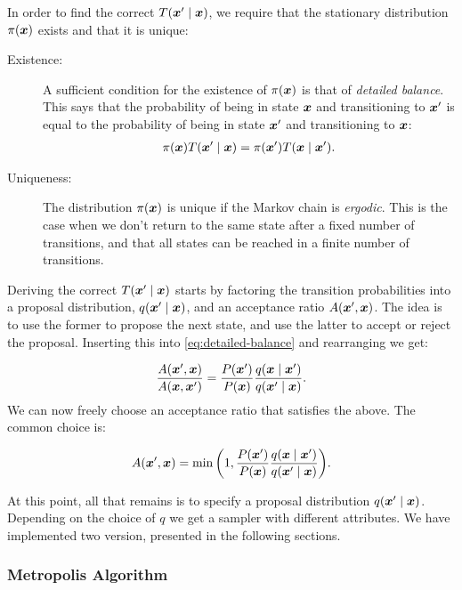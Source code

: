 \documentclass[Thesis.tex]{subfiles}
\begin{document}
In order to find the correct $T\qty(\bm{x}'\;\middle|\;\bm{x})$, we require that the stationary
distribution $\pi(\bm{x})$ exists and that it is unique:

\begin{description}
\item[Existence:] A sufficient condition for the existence of $\pi(\bm{x})$ is that
  of \emph{detailed balance}. This says that the probability of being in state
  $\bm{x}$ and transitioning to $\bm{x}'$ is equal to the probability of being in state
  $\bm{x}'$ and transitioning to $\bm{x}$:
  \begin{align}
    \label{eq:detailed-balance}
    \pi\qty(\bm{x})T\qty(\bm{x}'\;\middle|\;\bm{x}) = \pi\qty(\bm{x}')T\qty(\bm{x}\;\middle|\;\bm{x}').
  \end{align}
\item[Uniqueness:] The distribution $\pi(\bm{x})$ is unique if the Markov chain is
  \emph{ergodic}. This is the case when we don't return to the same state after
  a fixed number of transitions, and that all states can be reached in a finite
  number of transitions.
\end{description}
Deriving the correct $T\qty(\bm{x}'\;\middle|\;\bm{x})$ starts by factoring the transition
probabilities into a proposal distribution, $q\qty(\bm{x}'\;\middle|\;\bm{x})$, and an
acceptance ratio $A\qty(\bm{x}',\bm{x})$. The idea is to use the former to propose the
next state, and use the latter to accept or reject the proposal. Inserting this
into \cref{eq:detailed-balance} and rearranging we get:

\begin{align}
  \frac{A\qty(\bm{x}',\bm{x})}{A\qty(\bm{x},\bm{x}')} = \frac{P\qty(\bm{x}')}{P\qty(\bm{x})}\frac{q\qty(\bm{x}\;\middle|\;\bm{x}')}{q\qty(\bm{x}'\;\middle|\;\bm{x})}.
\end{align}
We can now freely choose an acceptance ratio that satisfies the above. The
common choice is:

\begin{align}
  A\qty(\bm{x}',\bm{x}) = \min\qty(1, \frac{P\qty(\bm{x}')}{P\qty(\bm{x})}\frac{q\qty(\bm{x}\;\middle|\;\bm{x}')}{q\qty(\bm{x}'\;\middle|\;\bm{x})}).
\end{align}

At this point, all that remains is to specify a proposal distribution
$q\qty(\bm{x}'\;\middle|\;\bm{x})$. Depending on the choice of $q$ we get a sampler with
different attributes. We have implemented two version, presented in the following
sections.

\subsubsection{Metropolis Algorithm}
\end{document}
